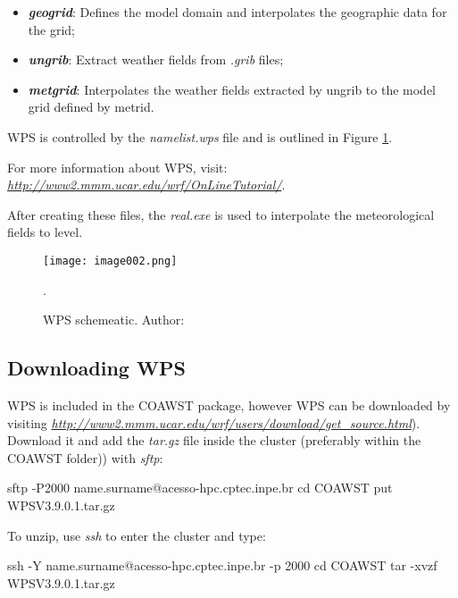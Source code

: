 \begin{itemize}
\item \textbf{\textit{geogrid}}: Defines the model domain and interpolates the geographic data for the grid;
\item \textbf{\textit{ungrib}}: Extract weather fields from \textit{.grib} files;
\item \textbf{\textit{metgrid}}: Interpolates the weather fields extracted by ungrib to the model grid defined by metrid.
\end{itemize}
\bigskip

\noindent WPS is controlled by the \textit{namelist.wps} file and is outlined in Figure \textcolor{bleu_cite}{\ref{wpsdetalha}}.
\bigskip

\noindent For more information about WPS, visit: \textcolor{bleu_cite}{\href{http://www2.mmm.ucar.edu/wrf/OnLineTutorial/}{\textit{http://www2.mmm.ucar.edu/wrf/OnLineTutorial/}}}.
\bigskip

\noindent After creating these files, the \textit{real.exe} is used to interpolate the meteorological fields to \texteta level.
\bigskip

\begin{figure}[H]
    \centering
    \texttt{[image: image002.png]}
    \caption{WPS schemeatic. \newline Author: \textcite{duda2006}}.
    \label{wpsdetalha}
\end{figure}
\bigskip

\subsection{Downloading WPS}
\bigskip

\noindent WPS is included in the COAWST package, however WPS can be downloaded by visiting 
\textcolor{bleu_cite}{\href{http://www2.mmm.ucar.edu/wrf/users/download/get\_source.html}{\textit{http://www2.mmm.ucar.edu/wrf/users/download/get\_source.html}}}). 
Download it and add the  \textit{tar.gz} file inside the cluster (preferably within the COAWST folder)) with \textit{sftp}:
\bigskip

\begin{bashcode}
sftp -P2000 name.surname@acesso-hpc.cptec.inpe.br
cd COAWST
put WPSV3.9.0.1.tar.gz
\end{bashcode}
\bigskip

\noindent To unzip, use \textit{ssh} to enter the cluster and type:
\bigskip

\begin{bashcode}
ssh -Y name.surname@acesso-hpc.cptec.inpe.br -p 2000
cd COAWST
tar -xvzf WPSV3.9.0.1.tar.gz
\end{bashcode}
\bigskip

